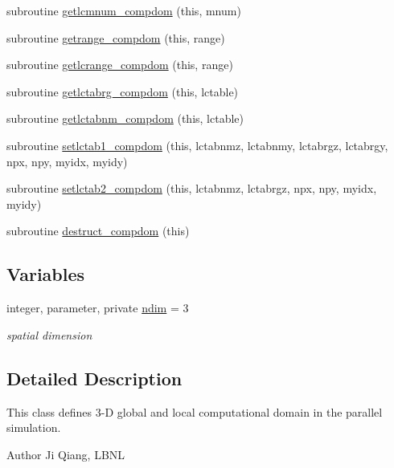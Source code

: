\begin{DoxyCompactItemize}
subroutine \mbox{\hyperlink{namespacecompdomclass_a545b0a4e8dce9ec9c326806ed1b36598}{getlcmnum\+\_\+compdom}} (this, mnum)
\item 
subroutine \mbox{\hyperlink{namespacecompdomclass_acba710aa1017492e05a537273742cc16}{getrange\+\_\+compdom}} (this, range)
\item 
subroutine \mbox{\hyperlink{namespacecompdomclass_ad0a907860c5bf17c263d8ad957c7ed1d}{getlcrange\+\_\+compdom}} (this, range)
\item 
subroutine \mbox{\hyperlink{namespacecompdomclass_ab679e7ac8218e1580f1a45a53d1fe9f1}{getlctabrg\+\_\+compdom}} (this, lctable)
\item 
subroutine \mbox{\hyperlink{namespacecompdomclass_a7c7c1450a459bb1753ef8230ab0d7651}{getlctabnm\+\_\+compdom}} (this, lctable)
\item 
subroutine \mbox{\hyperlink{namespacecompdomclass_a60f5ad087b624e541fe9c0872e1c4b90}{setlctab1\+\_\+compdom}} (this, lctabnmz, lctabnmy, lctabrgz, lctabrgy, npx, npy, myidx, myidy)
\item 
subroutine \mbox{\hyperlink{namespacecompdomclass_a4bc32865e40fe6b277898a429caff3ca}{setlctab2\+\_\+compdom}} (this, lctabnmz, lctabrgz, npx, npy, myidx, myidy)
\item 
subroutine \mbox{\hyperlink{namespacecompdomclass_ae220a1544909bd8851faed61ce9ad7b8}{destruct\+\_\+compdom}} (this)
\end{DoxyCompactItemize}
\subsection*{Variables}
\begin{DoxyCompactItemize}
\item 
integer, parameter, private \mbox{\hyperlink{namespacecompdomclass_a01f031d8af670f66db4484cd6411e99f}{ndim}} = 3
\begin{DoxyCompactList}\small\item\em spatial dimension \end{DoxyCompactList}\end{DoxyCompactItemize}


\subsection{Detailed Description}
This class defines 3-\/D global and local computational domain in the parallel simulation. 

\begin{DoxyAuthor}{Author}
Ji Qiang, L\+B\+NL 
\end{DoxyAuthor}


